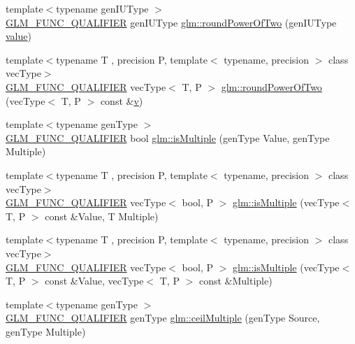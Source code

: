 \begin{DoxyCompactItemize}
\item 
{\footnotesize template$<$typename gen\+I\+U\+Type $>$ }\\\mbox{\hyperlink{setup_8hpp_a33fdea6f91c5f834105f7415e2a64407}{G\+L\+M\+\_\+\+F\+U\+N\+C\+\_\+\+Q\+U\+A\+L\+I\+F\+I\+ER}} gen\+I\+U\+Type \mbox{\hyperlink{group__gtc__round_ga6d24a9e3abe3e6a908661b43acb8efe0}{glm\+::round\+Power\+Of\+Two}} (gen\+I\+U\+Type \mbox{\hyperlink{glad_8h_a03aff08f73d7fde3d1a08e0abd8e84fa}{value}})
\item 
{\footnotesize template$<$typename T , precision P, template$<$ typename, precision $>$ class vec\+Type$>$ }\\\mbox{\hyperlink{setup_8hpp_a33fdea6f91c5f834105f7415e2a64407}{G\+L\+M\+\_\+\+F\+U\+N\+C\+\_\+\+Q\+U\+A\+L\+I\+F\+I\+ER}} vec\+Type$<$ T, P $>$ \mbox{\hyperlink{group__gtc__round_gae95be3b384f3bbd00c6c1cf0a1f96485}{glm\+::round\+Power\+Of\+Two}} (vec\+Type$<$ T, P $>$ const \&\mbox{\hyperlink{glad_8h_a14cfbe2fc2234f5504618905b69d1e06}{v}})
\item 
{\footnotesize template$<$typename gen\+Type $>$ }\\\mbox{\hyperlink{setup_8hpp_a33fdea6f91c5f834105f7415e2a64407}{G\+L\+M\+\_\+\+F\+U\+N\+C\+\_\+\+Q\+U\+A\+L\+I\+F\+I\+ER}} bool \mbox{\hyperlink{namespaceglm_a1749b696a2f7a956da67d67a557ae134}{glm\+::is\+Multiple}} (gen\+Type Value, gen\+Type Multiple)
\item 
{\footnotesize template$<$typename T , precision P, template$<$ typename, precision $>$ class vec\+Type$>$ }\\\mbox{\hyperlink{setup_8hpp_a33fdea6f91c5f834105f7415e2a64407}{G\+L\+M\+\_\+\+F\+U\+N\+C\+\_\+\+Q\+U\+A\+L\+I\+F\+I\+ER}} vec\+Type$<$ bool, P $>$ \mbox{\hyperlink{group__gtc__round_ga50ea5d5dc33fffba39ad6002a3784123}{glm\+::is\+Multiple}} (vec\+Type$<$ T, P $>$ const \&Value, T Multiple)
\item 
{\footnotesize template$<$typename T , precision P, template$<$ typename, precision $>$ class vec\+Type$>$ }\\\mbox{\hyperlink{setup_8hpp_a33fdea6f91c5f834105f7415e2a64407}{G\+L\+M\+\_\+\+F\+U\+N\+C\+\_\+\+Q\+U\+A\+L\+I\+F\+I\+ER}} vec\+Type$<$ bool, P $>$ \mbox{\hyperlink{group__gtc__round_ga7ae705574ef3e3ebfb4f537d8d285c48}{glm\+::is\+Multiple}} (vec\+Type$<$ T, P $>$ const \&Value, vec\+Type$<$ T, P $>$ const \&Multiple)
\item 
{\footnotesize template$<$typename gen\+Type $>$ }\\\mbox{\hyperlink{setup_8hpp_a33fdea6f91c5f834105f7415e2a64407}{G\+L\+M\+\_\+\+F\+U\+N\+C\+\_\+\+Q\+U\+A\+L\+I\+F\+I\+ER}} gen\+Type \mbox{\hyperlink{group__gtc__round_gac84898c466e609cdd2e81d9ba907d9e8}{glm\+::ceil\+Multiple}} (gen\+Type Source, gen\+Type Multiple)

\end{DoxyCompactItemize}
